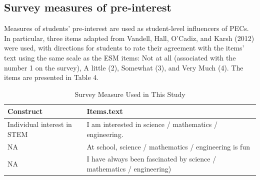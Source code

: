 \documentclass[]{msu-thesis}
\theoremstyle{definition}
\theoremstyle{definition}
\theoremstyle{definition}
\theoremstyle{remark}
\begin{document}
\begin{table}

\caption{\label{tab:unnamed-chunk-5}ESM measures for profiles of engagement and its conditions (PECs)}
\centering
{}
\end{table}

\subsection{Survey measures of
pre-interest}\label{survey-measures-of-pre-interest}

Measures of students' pre-interest are used as student-level influencers
of PECs. In particular, three items adapted from Vandell, Hall, O'Cadiz,
and Karsh (2012) were used, with directions for students to rate their
agreement with the items' text using the same scale as the ESM items:
Not at all (associated with the number 1 on the survey), A little (2),
Somewhat (3), and Very Much (4). The items are presented in Table 4.

\begin{table}

\caption{\label{tab:unnamed-chunk-6}Survey Measure Used in This Study}
\centering
\begin{tabular}[t]{ll}
\toprule
Construct & Items.text\\
\midrule
Individual interest in STEM & I am interested in science / mathematics / engineering.\\
NA & At school, science / mathematics / engineering is fun\\
NA & I have always been fascinated by science / mathematics / engineering)\\
\bottomrule
\end{tabular}
\end{table}
\end{document}
